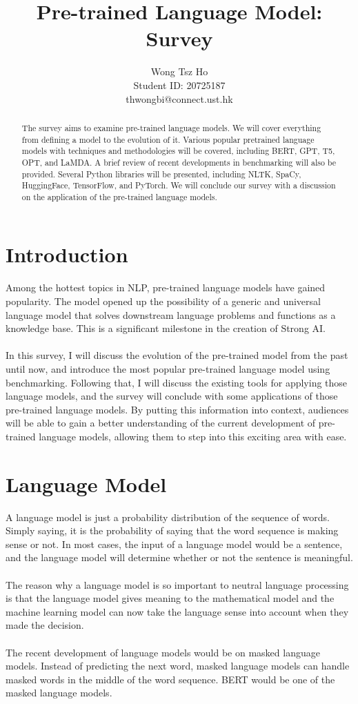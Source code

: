 \documentclass[a4paper, 11pt]{article}
\title{Pre-trained Language Model: Survey}
\author{
{\rm Wong Tsz Ho}\\
Student ID: 20725187\\
thwongbi@connect.ust.hk
} %
\begin{document}
\maketitle
\thispagestyle{plain} %
\pagestyle{plain} %
\begin{abstract}
The survey aims to examine pre-trained language models. We will cover everything from defining a model to the evolution of it. Various popular pretrained language models with techniques and methodologies will be covered, including BERT, GPT, T5, OPT, and LaMDA. A brief review of recent developments in benchmarking will also be provided. Several Python libraries will be presented, including NLTK, SpaCy, HuggingFace, TensorFlow, and PyTorch. We will conclude our survey with a discussion on the application of the pre-trained language models.
\end{abstract}

\section{Introduction}

Among the hottest topics in NLP, pre-trained language models have gained popularity. The model opened up the possibility of a generic and universal language model that solves downstream language problems and functions as a knowledge base. This is a significant milestone in the creation of Strong AI. \\
\\
In this survey, I will discuss the evolution of the pre-trained model from the past until now, and introduce the most popular pre-trained language model using benchmarking. Following that, I will discuss the existing tools for applying those language models, and the survey will conclude with some applications of those pre-trained language models. By putting this information into context, audiences will be able to gain a better understanding of the current development of pre-trained language models, allowing them to step into this exciting area with ease.

\section{Language Model}

A language model is just a probability distribution of the sequence of words. Simply saying, it is the probability of saying that the word sequence is making sense or not. In most cases, the input of a language model would be a sentence, and the language model will determine whether or not the sentence is meaningful.\\
\\
The reason why a language model is so important to neutral language processing is that the language model gives meaning to the mathematical model and the machine learning model can now take the language sense into account when they made the decision.\\
\\
The recent development of language models would be on masked language models. Instead of predicting the next word, masked language models can handle masked words in the middle of the word sequence. BERT would be one of the masked language models.
\end{document}
